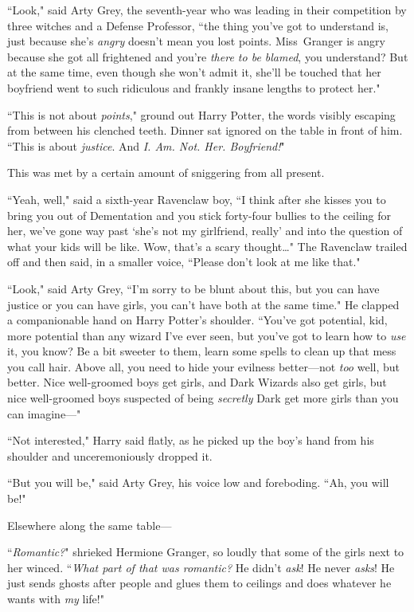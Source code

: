 ``Look," said Arty Grey, the seventh-year who was leading in their competition by three witches and a Defense Professor, ``the thing you've got to understand is, just because she's \emph{angry} doesn't mean you lost points. Miss~Granger is angry because she got all frightened and you're \emph{there to be blamed}, you understand? But at the same time, even though she won't admit it, she'll be touched that her boyfriend went to such ridiculous and frankly insane lengths to protect her."

``This is not about \emph{points}," ground out Harry Potter, the words visibly escaping from between his clenched teeth. Dinner sat ignored on the table in front of him. ``This is about \emph{justice}. And \emph{I\@. Am. Not. Her. Boyfriend!}"

This was met by a certain amount of sniggering from all present.

``Yeah, well," said a sixth-year Ravenclaw boy, ``I think after she kisses you to bring you out of Dementation and you stick forty-four bullies to the ceiling for her, we've gone way past `she's not my girlfriend, really' and into the question of what your kids will be like. Wow, that's a scary thought{\ldots}" The Ravenclaw trailed off and then said, in a smaller voice, ``Please don't look at me like that."

``Look," said Arty Grey, ``I'm sorry to be blunt about this, but you can have justice or you can have girls, you can't have both at the same time." He clapped a companionable hand on Harry Potter's shoulder. ``You've got potential, kid, more potential than any wizard I've ever seen, but you've got to learn how to \emph{use} it, you know? Be a bit sweeter to them, learn some spells to clean up that mess you call hair. Above all, you need to hide your evilness better—not \emph{too} well, but better. Nice well-groomed boys get girls, and Dark Wizards also get girls, but nice well-groomed boys suspected of being \emph{secretly} Dark get more girls than you can imagine—"

``Not interested," Harry said flatly, as he picked up the boy's hand from his shoulder and unceremoniously dropped it.

``But you will be," said Arty Grey, his voice low and foreboding. ``Ah, you will be!"

Elsewhere along the same table—

``\emph{Romantic?}" shrieked Hermione Granger, so loudly that some of the girls next to her winced. ``\emph{What part of that was romantic?} He didn't \emph{ask}! He never \emph{asks}! He just sends ghosts after people and glues them to ceilings and does whatever he wants with \emph{my} life!"

